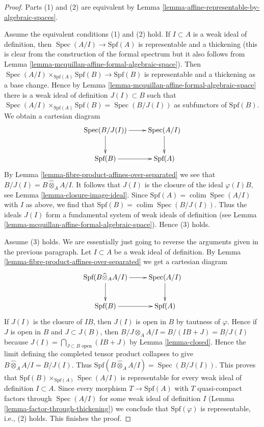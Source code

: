 \documentclass{stacks-project}
\theoremstyle{plain}
\theoremstyle{definition}
\theoremstyle{remark}
\numberwithin{equation}{subsection}
\def\colim{\mathop{\mathrm{colim}}\nolimits}
\def\Spec{\mathop{\mathrm{Spec}}}
\begin{document}
\begin{proof}
Parts (1) and (2) are equivalent by
Lemma \ref{lemma-affine-representable-by-algebraic-spaces}.

\medskip\noindent
Assume the equivalent conditions (1) and (2) hold.
If $I \subset A$ is a weak ideal of definition, then
$\Spec(A/I) \to \text{Spf}(A)$ is representable and a thickening
(this is clear from the construction of the formal spectrum
but it also follows from
Lemma \ref{lemma-mcquillan-affine-formal-algebraic-space}).
Then $\Spec(A/I) \times_{\text{Spf}(A)} \text{Spf}(B) \to \text{Spf}(B)$
is representable and a thickening as a base change.
Hence by
Lemma \ref{lemma-mcquillan-affine-formal-algebraic-space}
there is a weak ideal of definition $J(I) \subset B$ such that
$\Spec(A/I) \times_{\text{Spf}(A)} \text{Spf}(B) = \Spec(B/J(I))$
as subfunctors of $\text{Spf}(B)$. We obtain a cartesian diagram
$$
\xymatrix{
\Spec(B/J(I)) \ar[d] \ar[r] & \Spec(A/I) \ar[d] \\
\text{Spf}(B) \ar[r] & \text{Spf}(A)
}
$$
By Lemma \ref{lemma-fibre-product-affines-over-separated}
we see that $B/J(I) = B \widehat{\otimes}_A A/I$.
It follows that $J(I)$ is the closure of the ideal $\varphi(I)B$, see
Lemma \ref{lemma-closure-image-ideal}.
Since $\text{Spf}(A) = \colim \Spec(A/I)$ with $I$ as above,
we find that $\text{Spf}(B) = \colim \Spec(B/J(I))$.
Thus the ideals $J(I)$ form a fundamental system of weak
ideals of definition (see
Lemma \ref{lemma-mcquillan-affine-formal-algebraic-space}).
Hence (3) holds.

\medskip\noindent
Assume (3) holds. We are essentially just going to reverse the
arguments given in the previous paragraph.
Let $I \subset A$ be a weak ideal of definition.
By Lemma \ref{lemma-fibre-product-affines-over-separated}
we get a cartesian diagram
$$
\xymatrix{
\text{Spf}(B \widehat{\otimes}_A A/I) \ar[d] \ar[r] & \Spec(A/I) \ar[d] \\
\text{Spf}(B) \ar[r] & \text{Spf}(A)
}
$$
If $J(I)$ is the closure of $IB$, then $J(I)$ is open in $B$
by tautness of $\varphi$. Hence if $J$ is open in $B$ and $J \subset J(B)$,
then $B/J \otimes_A A/I = B/(IB + J) = B/J(I)$ because
$J(I) = \bigcap_{J \subset B\text{ open}} (IB + J)$ by Lemma \ref{lemma-closed}.
Hence the limit defining the completed tensor product collapses to give
$B \widehat{\otimes}_A A/I = B/J(I)$.
Thus $\text{Spf}(B \widehat{\otimes}_A A/I) = \Spec(B/J(I))$.
This proves that $\text{Spf}(B) \times_{\text{Spf}(A)} \Spec(A/I)$
is representable for every weak ideal of definition $I \subset A$.
Since every morphism $T \to \text{Spf}(A)$ with $T$ quasi-compact
factors through $\Spec(A/I)$ for some weak ideal of definition $I$
(Lemma \ref{lemma-factor-through-thickening})
we conclude that $\text{Spf}(\varphi)$ is representable, i.e.,
(2) holds. This finishes the proof.
\end{proof}
\end{document}
